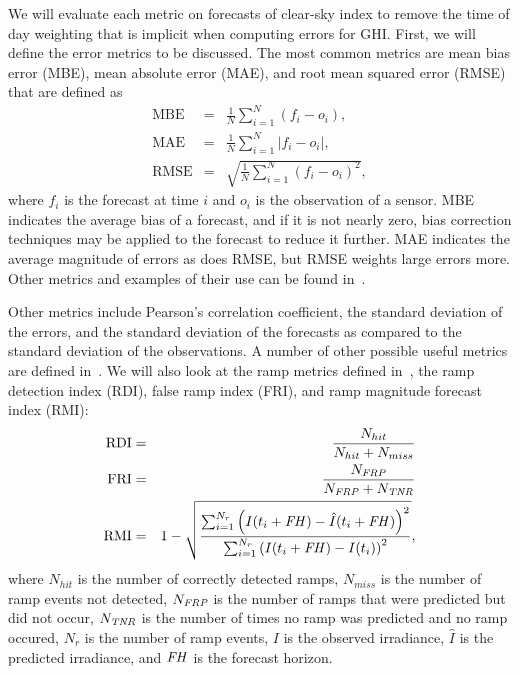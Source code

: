 We will evaluate each metric on forecasts of clear-sky index to remove
the time of day weighting that is implicit when computing errors for
GHI.
First, we will define the error metrics to be discussed.
The most common metrics are mean bias error (MBE), mean absolute error
(MAE), and root mean squared error (RMSE) that are defined as
\begin{eqnarray}
\mbox{MBE} &=& \frac{1}{N} \sum_{i=1}^N (f_i - o_i), \\
\mbox{MAE} &=& \frac{1}{N} \sum_{i=1}^N |f_i - o_i|, \\
\mbox{RMSE} &=& \sqrt{\frac{1}{N} \sum_{i=1}^N (f_i - o_i)^2},
\end{eqnarray}
where $f_i$ is the forecast at time $i$ and $o_i$ is the observation
of a sensor.
MBE indicates the average bias of a forecast, and if it is not nearly
zero, bias correction techniques may be applied to the forecast to
reduce it further.
MAE indicates the average magnitude of errors as does RMSE, but RMSE
weights large errors more.
Other metrics and examples of their use can be found
in~\cite{Zhang2015,Jensen2016}.

Other metrics include Pearson's correlation coefficient, the standard
deviation of the errors, and the standard deviation of the forecasts
as compared to the standard deviation of the observations.
A number of other possible useful metrics are defined
in~\cite{Zhang2015}.
We will also look at the ramp metrics defined in~\cite{Chu2015b}, the
ramp detection index (RDI), false ramp index (FRI), and ramp
magnitude forecast index (RMI):
\begin{eqnarray}
\mbox{RDI} &=& \frac{N_{hit}}{N_{hit} + N_{miss}}\\
\mbox{FRI} &=& \frac{N_{\text{\em FRP\/}}}{N_\text{\em FRP\/} +
               N_\text{\em TNR\/}}\\
\mbox{RMI} &=& 1 - \sqrt{\frac{\sum_{i=1}^{N_r} \left( I(t_i + \text{\em FH\/}) -
               \hat{I}(t_i + \text{\em FH\/}) \right)^2}{\sum_{i=1}^{N_r}\left( I(t_i
               + \text{\em FH\/}) - I(t_i) \right)^2}},
\end{eqnarray}
where $N_{hit}$ is the number of correctly detected ramps, $N_{miss}$
is the number of ramp events not detected, $N_\text{\em FRP}$ is the
number of ramps that were predicted but did not occur, $N_\text{\em
TNR}$ is the number of times no ramp was predicted and no ramp
occured, $N_r$ is the number of ramp events, $I$ is the observed
irradiance, $\hat{I}$ is the predicted irradiance, and $\text{\em
FH\/}$ is the forecast horizon.

